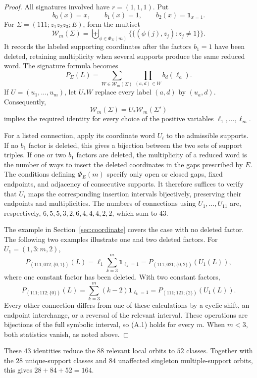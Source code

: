 \documentclass[12pt]{article}
\begin{document}
\begin{proof}
All signatures involved have $r=(1,1,1)$.  Put
\[
b_0(x)=x,\qquad b_1(x)=1,\qquad
b_2(x)=\mathbf1_{x=1}.
\]
For $\Sigma=(111;z_1z_2z_3;E)$, form the multiset
\[
\mathcal W_m(\Sigma)
=
\mathop{\biguplus}_{\phi\in\Phi_E(m)}
\bigl\{\!\bigl\{(\phi(j),z_j):z_j\ne1\bigr\}\!\bigr\}.
\]
It records the labeled supporting coordinates after the factors
$b_1=1$ have been deleted, retaining multiplicity when several supports
produce the same reduced word.  The signature formula becomes
\[
P_\Sigma(L)
=
\sum_{W\in\mathcal W_m(\Sigma)}
\prod_{(a,d)\in W}b_d(\ell_a).
\]
If $U=(u_1,\ldots,u_m)$, let $U_*W$ replace every label $(a,d)$ by
$(u_a,d)$.  Consequently,
\[
\mathcal W_m(\Sigma)
=
U_*\mathcal W_m(\Sigma')
\tag{A.1}
\]
implies the required identity for every choice of the positive variables
$\ell_1,\ldots,\ell_m$.

For a listed connection, apply its coordinate word $U_i$ to the admissible
supports.  If no $b_1$ factor is deleted, this gives a bijection between the
two sets of support triples.  If one or two $b_1$ factors are deleted, the
multiplicity of a reduced word is the number of ways to insert the deleted
coordinates in the gaps prescribed by $E$.  The conditions defining
$\Phi_E(m)$ specify only open or closed gaps, fixed endpoints, and adjacency
of consecutive supports.  It therefore suffices to verify that $U_i$ maps the
corresponding insertion intervals bijectively, preserving their endpoints and
multiplicities.  The numbers of connections using
$U_1,\ldots,U_{11}$ are, respectively,
$6,5,5,3,2,6,4,4,4,2,2$, which sum to $43$.

The example in Section~\ref{sec:coordinate} covers the case with no deleted
factor.  The following two examples illustrate one and two deleted factors.
For $U_1=(1,3{:}m,2)$,
\[
P_{(111;012;\{0,1\})}(L)
=
\ell_1\sum_{k=3}^{m}\mathbf1_{\ell_k=1}
=
P_{(111;021;\{0,2\})}(U_1(L)),
\]
where one constant factor has been deleted.  With two constant factors,
\[
P_{(111;112;\{0\})}(L)
=
\sum_{k=3}^{m}(k-2)\mathbf1_{\ell_k=1}
=
P_{(111;121;\{2\})}(U_1(L)).
\]
Every other connection differs from one of these calculations by a cyclic
shift, an endpoint interchange, or a reversal of the relevant interval.
These operations are bijections of the full symbolic interval, so
\textup{(A.1)} holds for every $m$.  When $m<3$, both statistics vanish, as
noted above.
\end{proof}

These $43$ identities reduce the $88$ relevant local orbits to $52$ classes.
Together with the $28$ unique-support classes and $84$ unaffected singleton
multiple-support orbits, this gives
$28+84+52=164$.
\end{document}
